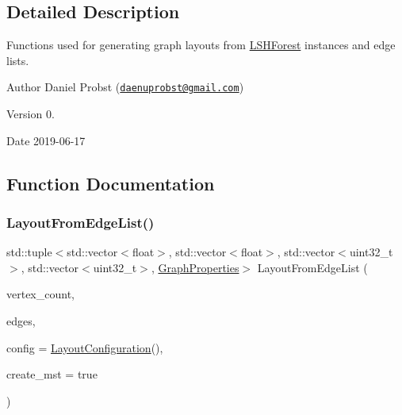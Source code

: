

\subsection{Detailed Description}
Functions used for generating graph layouts from \hyperlink{classLSHForest}{L\+S\+H\+Forest} instances and edge lists. 

\begin{DoxyAuthor}{Author}
Daniel Probst (\href{mailto:daenuprobst@gmail.com}{\tt daenuprobst@gmail.\+com}) 
\end{DoxyAuthor}
\begin{DoxyVersion}{Version}
0. 
\end{DoxyVersion}
\begin{DoxyDate}{Date}
2019-\/06-\/17 
\end{DoxyDate}


\subsection{Function Documentation}
\mbox{\label{layout_8hh_a287eac7d9621f833da1f42c06a9cd431}} 
\subsubsection{\texorpdfstring{Layout\+From\+Edge\+List()}{LayoutFromEdgeList()}}
{\footnotesize\ttfamily std\+::tuple$<$std\+::vector$<$float$>$, std\+::vector$<$float$>$, std\+::vector$<$uint32\+\_\+t$>$, std\+::vector$<$uint32\+\_\+t$>$, \hyperlink{structGraphProperties}{Graph\+Properties}$>$ Layout\+From\+Edge\+List (\begin{DoxyParamCaption}\item[{uint32\+\_\+t}]{vertex\+\_\+count,  }\item[{const std\+::vector$<$ std\+::tuple$<$ uint32\+\_\+t, uint32\+\_\+t, float $>$$>$ \&}]{edges,  }\item[{\hyperlink{structLayoutConfiguration}{Layout\+Configuration}}]{config = {\ttfamily \hyperlink{structLayoutConfiguration}{Layout\+Configuration}()},  }\item[{bool}]{create\+\_\+mst = {\ttfamily true} }\end{DoxyParamCaption})}



